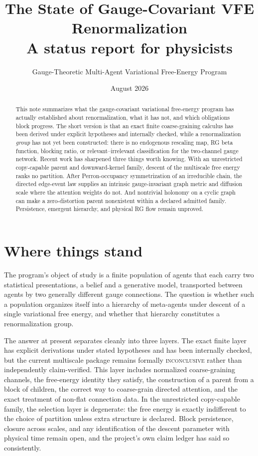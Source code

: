 \documentclass[11pt,letterpaper]{article}
\title{The State of Gauge-Covariant VFE Renormalization\\
\large A status report for physicists}
\author{Gauge-Theoretic Multi-Agent Variational Free-Energy Program}
\date{August 2026}
\begin{document}
\maketitle

\begin{abstract}
This note summarizes what the gauge-covariant variational free-energy program has
actually established about renormalization, what it has not, and which obligations
block progress. The short version is that an exact finite coarse-graining calculus
has been derived under explicit hypotheses and internally checked, while a
renormalization \emph{group} has not yet been constructed: there is no endogenous
rescaling map, RG beta function, blocking ratio, or relevant--irrelevant
classification for the two-channel gauge network. Recent work has sharpened three
things worth knowing. With an unrestricted copy-capable parent and downward-kernel
family, descent of the multiscale free energy ranks no partition. After
Perron-occupancy symmetrization of an irreducible chain, the directed edge-event law
supplies an intrinsic gauge-invariant graph metric and diffusion scale where the
attention weights do not. And nontrivial holonomy on a cyclic graph can make a
zero-distortion parent nonexistent within a declared admitted family. Persistence,
emergent hierarchy, and physical RG flow remain unproved.
\end{abstract}

\section{Where things stand}

The program's object of study is a finite population of agents that each carry two
statistical presentations, a belief and a generative model, transported between
agents by two generally different gauge connections. The question is whether such a
population organizes itself into a hierarchy of meta-agents under descent of a
single variational free energy, and whether that hierarchy constitutes a
renormalization group.

The answer at present separates cleanly into three layers. The exact finite layer
has explicit derivations under stated hypotheses and has been internally checked,
but the current multiscale package remains formally \textsc{inconclusive} rather
than independently claim-verified. This layer includes normalized coarse-graining
channels, the free-energy identity they satisfy, the construction of a parent from
a block of children, the correct way to coarse-grain directed attention, and the
exact treatment of non-flat connection data. In the unrestricted copy-capable
family, the selection layer is degenerate: the free energy is exactly indifferent
to the choice of partition unless extra structure is declared. Block persistence,
closure across scales, and any identification of the descent parameter with physical
time remain open, and the project's own claim ledger has said so consistently.
\end{document}
